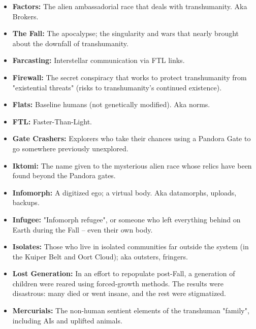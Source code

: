 \begin{itemize}
   \item \textbf{Factors:} The alien ambassadorial race that deals with
      transhumanity. Aka Brokers.  

   \item \textbf{The Fall:} The apocalypse; the singularity and wars that
      nearly brought about the downfall of transhumanity.  

   \item \textbf{Farcasting:} Interstellar communication via FTL links.  

   \item \textbf{Firewall:} The secret conspiracy that works to protect
      transhumanity from "existential threats" (risks to transhumanity's
      continued existence).  

   \item \textbf{Flats:} Baseline humans (not genetically modified). Aka norms.

   \item \textbf{FTL:} Faster-Than-Light.  

   \item \textbf{Gate Crashers:} Explorers who take their chances using a
      Pandora Gate to go somewhere previously unexplored.  

   \item \textbf{Iktomi:} The name given to the mysterious alien race whose
      relics have been found beyond the Pandora gates.

   \item \textbf{Infomorph:} A digitized ego; a virtual body. Aka datamorphs,
      uploads, backups.

   \item \textbf{Infugee:} "Infomorph refugee", or someone who left everything
      behind on Earth during the Fall -- even their own body.

   \item \textbf{Isolates:} Those who live in isolated communities far outside
      the system (in the Kuiper Belt and Oort Cloud); aka outsters, fringers.  

   \item \textbf{Lost Generation:} In an effort to repopulate post-Fall, a
      generation of children were reared using forced-growth methods. The
      results were disastrous: many died or went insane, and the rest were
      stigmatized.  

   \item \textbf{Mercurials:} The non-human sentient elements of the
      transhuman "family", including AIs and uplifted animals.  


\end{itemize}

